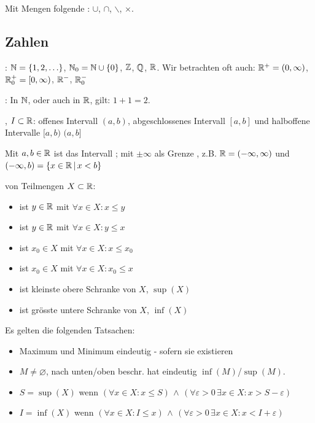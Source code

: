\Def Mit Mengen folgende :
$\cup$, $\cap$, $\backslash$, $\times$.

\subsection{Zahlen}

\Def {}: $\mathbb{N} = \{1, 2, \ldots\}$, $\mathbb{N}_0 = \mathbb{N} \cup \{0\}$, $\mathbb{Z}$, $\mathbb{Q}$, $\mathbb{R}$.
Wir betrachten oft auch: $\mathbb{R}^+ = (0, \infty)$, $\mathbb{R}^+_0 = [0, \infty)$, $\mathbb{R}^-$, $\mathbb{R}^-_0$

\Satz {}: In $\mathbb{N}$, oder auch in $\mathbb{R}$, gilt: $1 + 1 = 2$.

\Def {}, $I \subset \mathbb{R}$:
offenes Intervall $(a, b)$, abgeschlossenes Intervall $[a, b]$ und halboffene Intervalle $[a, b)$ $(a, b]$

Mit $a, b \in \mathbb{R}$ ist das Intervall ; mit $\pm\infty$ als Grenze
, z.B. $\mathbb{R} = (-\infty, \infty)$ und $(-\infty, b) = \{x \in \mathbb{R} \, | \, x < b\}$

\Def {} von Teilmengen $X \subset \mathbb{R}$:
\vspace{-0.6em}
\begin{itemize}
    \item {} ist $y \in \mathbb{R}$ mit $\forall x \in X : x\le y$
    \item {} ist $y \in \mathbb{R}$ mit $\forall x \in X : y\le x$
    \item {} ist $x_0 \in X$ mit $\forall x \in X : x\le x_0$
    \item {} ist $x_0 \in X$ mit $\forall x \in X : x_0\le x$
    \item {} ist kleinste obere Schranke von $X$, $\sup(X)$
    \item {} ist grösste untere Schranke von $X$, $\inf(X)$
\end{itemize}

\Satz
Es gelten die folgenden Tatsachen:
\vspace{-0.6em}
\begin{itemize}
    \item Maximum und Minimum eindeutig - sofern sie existieren
    \item $M\ne \varnothing$, nach unten/oben beschr. hat eindeutig $\inf(M)$/$\sup(M)$.
    \item $S = \sup(X)$ wenn $(\forall x \in X : x\le S) \, \land \, (\forall \varepsilon > 0 \, \exists x \in X : x > S - \varepsilon)$
    \item $I = \inf(X)$ wenn $(\forall x \in X : I\le x) \, \land \, (\forall \varepsilon > 0 \, \exists x \in X : x < I + \varepsilon)$
\end{itemize}

